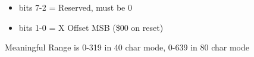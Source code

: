 \begin{itemize}
\item bits 7-2 = Reserved, must be 0
\item bits 1-0 = X Offset MSB (\$00 on reset)
\end{itemize}
Meaningful Range is 0-319 in 40 char mode, 0-639 in 80 char mode

